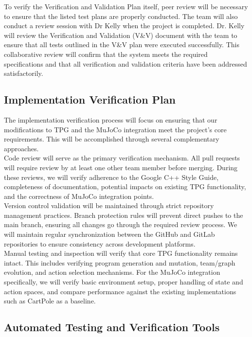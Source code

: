 \documentclass[12pt, titlepage]{article}
\begin{document}
To verify the Verification and Validation Plan itself, peer review will be necessary to ensure that the listed test plans are properly conducted. The team will also conduct a review session with Dr Kelly when the project is completed. Dr. Kelly will review the Verification and Validation (V\&V) document with the team to ensure that all tests outlined in the V\&V plan were executed successfully. This collaborative review will confirm that the system meets the required specifications and that all verification and validation criteria have been addressed satisfactorily.

\subsection{Implementation Verification Plan}

The implementation verification process will focus on ensuring that our modifications to TPG and the MuJoCo integration meet the project's core requirements. This will be accomplished through several complementary approaches. \\

Code review will serve as the primary verification mechanism. All pull requests will require review by at least one other team member before merging. During these reviews, we will verify adherence to the Google C++ Style Guide, completeness of documentation, potential impacts on existing TPG functionality, and the correctness of MuJoCo integration points. \\

Version control validation will be maintained through strict repository management practices. Branch protection rules will prevent direct pushes to the main branch, ensuring all changes go through the required review process. We will maintain regular synchronization between the GitHub and GitLab repositories to ensure consistency across development platforms. \\

Manual testing and inspection will verify that core TPG functionality remains intact. This includes verifying program generation and mutation, team/graph evolution, and action selection mechanisms. For the MuJoCo integration specifically, we will verify basic environment setup, proper handling of state and action spaces, and compare performance against the existing implementations such as CartPole as a baseline.

\subsection{Automated Testing and Verification Tools}
\end{document}
